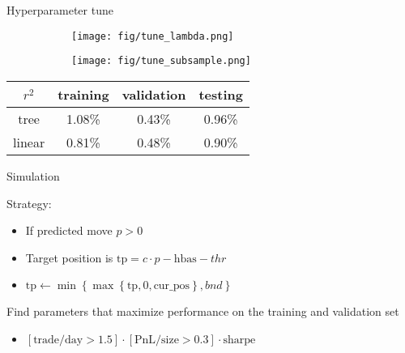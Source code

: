 \documentclass[9pt]{beamer}
\begin{document}
\begin{frame}{Hyperparameter tune}



\begin{figure}[h!]
    \centering
    \begin{subfigure}[b]{0.475\textwidth}
        \centering
        \texttt{[image: fig/tune\_lambda.png]}
        \label{fig:figure1}
    \end{subfigure}
    \begin{subfigure}[b]{0.475\textwidth}
        \centering
        \texttt{[image: fig/tune\_subsample.png]}
        \label{fig:figure2}
    \end{subfigure}
    \label{fig:three_figures}
\end{figure}

\begin{table}[h!]
\centering
\begin{tabular}{c|c|c|c}
\hline
$r^2$ & \textbf{training} & \textbf{validation} & \textbf{testing} \\ \hline
tree      & 1.08\%      & 0.43\%      & 0.96\%       \\ \hline
linear     & 0.81\%      & 0.48\%      & 0.90\%     \\ \hline
\end{tabular}
\end{table}

\end{frame}




\begin{frame}{Simulation}

Strategy:
\begin{itemize}
    \item If predicted move $p>0$
    \item Target position is $\text{tp} = c\cdot p-\text{hbas} - thr$
    \item $\text{tp}\leftarrow \min\left\{\max\left\{\text{tp}, 0, \text{cur\_pos}\right\}, bnd \right\}$
\end{itemize}



Find parameters that maximize performance on the training and validation set
\begin{itemize}
    \item $[\text{trade/day}>1.5]\cdot [\text{PnL/size}>0.3]\cdot \text{sharpe}$
\end{itemize}


\end{frame}
\end{document}
